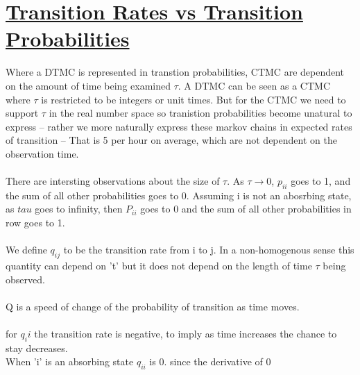 \documentclass{article}
\begin{document}
\section*{\underline{Transition Rates vs Transition Probabilities}}
Where a DTMC is represented in transtion probabilities, CTMC are dependent on
the amount of time being examined $\tau$. A DTMC can be seen as a CTMC where
$\tau$ is restricted to be integers or unit times. But for the CTMC we need to
support $\tau$ in the real number space so tranistion probabilities become
unatural to express -- rather we more naturally express these markov chains in
expected rates of transition -- That is 5 per hour on average, which are not
dependent on the observation time. 
\\
\\
There are intersting observations about the size of $\tau$. As $\tau
\rightarrow 0$, $p_{ii}$ goes to 1, and the sum of all other probabilities goes
to 0. Assuming i is not an abosrbing state, as $tau$ goes to infinity, then
$P_{ii}$ goes to 0 and the sum of all other probabilities in row goes to 1. 
\\
\\We define $q_{ij}$ to be the transition rate from i to j. In a non-homogenous
sense this quantity can depend on 't' but it does not depend on the length of
time $\tau$ being observed. 
\\
\\Q is a speed of change of the probability of transition as time moves. 
\\
\\for $q_ii$ the transition rate is negative, to imply as time increases the
chance to stay decreases. 
\\When 'i' is an absorbing state $q_{ii}$ is 0. since the derivative of 0
\end{document}
